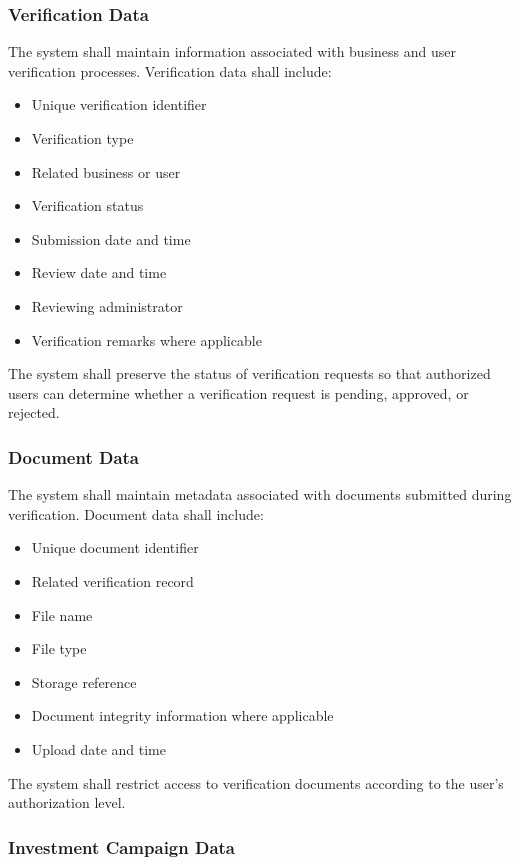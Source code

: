 \subsubsection{Verification Data}

The system shall maintain information associated with business and user
verification processes. Verification data shall include:

\begin{itemize}
    \item Unique verification identifier
    \item Verification type
    \item Related business or user
    \item Verification status
    \item Submission date and time
    \item Review date and time
    \item Reviewing administrator
    \item Verification remarks where applicable
\end{itemize}

The system shall preserve the status of verification requests so that
authorized users can determine whether a verification request is pending,
approved, or rejected.

\subsubsection{Document Data}

The system shall maintain metadata associated with documents submitted
during verification. Document data shall include:

\begin{itemize}
    \item Unique document identifier
    \item Related verification record
    \item File name
    \item File type
    \item Storage reference
    \item Document integrity information where applicable
    \item Upload date and time
\end{itemize}

The system shall restrict access to verification documents according to
the user's authorization level.

\subsubsection{Investment Campaign Data}


